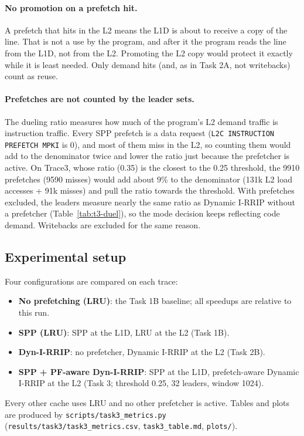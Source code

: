 \documentclass[11pt]{article}
\begin{document}
\paragraph{No promotion on a prefetch hit.}
A prefetch that hits in the L2 means the L1D is about to receive a copy of the
line. That is not a use by the program, and after it the program reads the
line from the L1D, not from the L2. Promoting the L2 copy would protect it
exactly while it is least needed. Only demand hits (and, as in Task 2A, not
writebacks) count as reuse.

\paragraph{Prefetches are not counted by the leader sets.}
The dueling ratio measures how much of the program's L2 demand traffic is
instruction traffic. Every SPP prefetch is a data request
(\texttt{L2C INSTRUCTION PREFETCH MPKI} is 0), and most of them miss in the
L2, so counting them would add to the denominator twice and lower the ratio
just because the prefetcher is active. On Trace3, whose ratio (0.35) is the
closest to the 0.25 threshold, the 9910 prefetches (9590 misses) would add
about 9\% to the denominator (131k L2 load accesses + 91k misses) and pull the
ratio towards the threshold. With prefetches excluded, the leaders measure
nearly the same ratio as Dynamic I-RRIP without a prefetcher
(Table~\ref{tab:t3-duel}), so the mode decision keeps reflecting code demand.
Writebacks are excluded for the same reason.

\subsection{Experimental setup}
Four configurations are compared on each trace:
\begin{itemize}
  \item \textbf{No prefetching (LRU)}: the Task 1B baseline; all speedups are
        relative to this run.
  \item \textbf{SPP (LRU)}: SPP at the L1D, LRU at the L2 (Task 1B).
  \item \textbf{Dyn-I-RRIP}: no prefetcher, Dynamic I-RRIP at the L2 (Task 2B).
  \item \textbf{SPP + PF-aware Dyn-I-RRIP}: SPP at the L1D, prefetch-aware
        Dynamic I-RRIP at the L2 (Task 3; threshold 0.25, 32 leaders, window
        1024).
\end{itemize}
Every other cache uses LRU and no other prefetcher is active. Tables and plots
are produced by \texttt{scripts/task3\_metrics.py}
(\texttt{results/task3/task3\_metrics.csv}, \texttt{task3\_table.md},
\texttt{plots/}).
\end{document}
